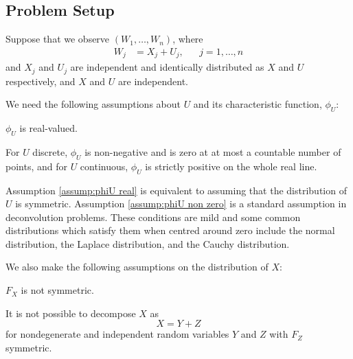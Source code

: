 	\subsection{Problem Setup}
	Suppose that we observe $(W_1, \dots, W_n)$, where
	\begin{align}
		W_j &= X_j + U_j, &&j = 1, \dots, n
	\end{align}
	and $X_j$ and $U_j$ are independent and identically distributed as $X$ and $U$ respectively, and $X$ and $U$ are independent. 


	We need the following assumptions about $U$ and its characteristic function, $\phi_U$:
	\begin{assumption}
	\label{assump:phiU real}
		$\phi_U$ is real-valued.
	\end{assumption}
	\begin{assumption}
	\label{assump:phiU non zero}
		For $U$ discrete, $\phi_U$ is non-negative and is zero at at most a countable number of points, and for $U$ continuous, $\phi_U$ is strictly positive on the whole real line.
	\end{assumption}

	Assumption \ref{assump:phiU real} is equivalent to assuming that the distribution of $U$ is symmetric. Assumption \ref{assump:phiU non zero} is a standard assumption in deconvolution problems. These conditions are mild and some common distributions which satisfy them when centred around zero include the normal distribution, the Laplace distribution, and the Cauchy distribution.


	We also make the following assumptions on the distribution of $X$:
	\begin{assumption}
	\label{assumpt: X not symmetric}
		$F_X$ is not symmetric.
	\end{assumption}
	\begin{assumption}
		\label{assump: X indecomposable}
		It is not possible to decompose $X$ as
		\begin{equation}
			X = Y + Z
		\end{equation}
		for nondegenerate and independent random variables $Y$ and $Z$ with $F_Z$ symmetric.
	\end{assumption}

